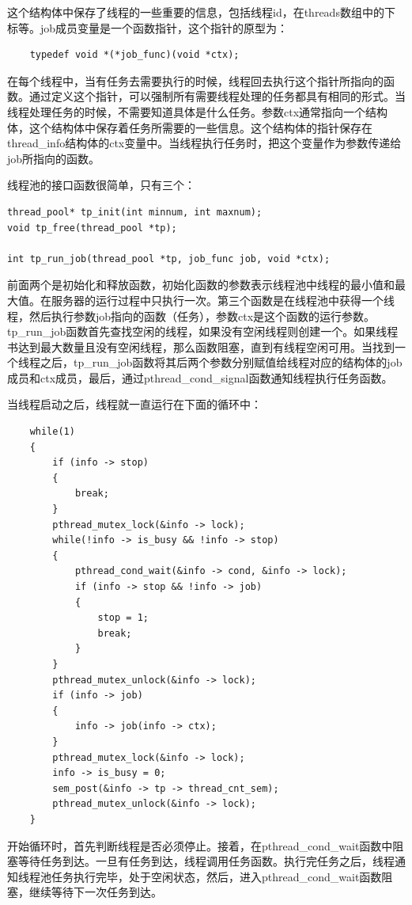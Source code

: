 \documentclass[12pt, twoside, a4paper, xetex]{report}
\begin{document}
	这个结构体中保存了线程的一些重要的信息，包括线程id，在threads数组中的下标等。job成员变量是一个函数指针，这个指针的原型为：
\begin{verbatim}
	typedef void *(*job_func)(void *ctx); 
\end{verbatim}

	在每个线程中，当有任务去需要执行的时候，线程回去执行这个指针所指向的函数。通过定义这个指针，可以强制所有需要线程处理的任务都具有相同的形式。当线程处理任务的时候，不需要知道具体是什么任务。参数ctx通常指向一个结构体，这个结构体中保存着任务所需要的一些信息。这个结构体的指针保存在thread\_info结构体的ctx变量中。当线程执行任务时，把这个变量作为参数传递给job所指向的函数。
	
	线程池的接口函数很简单，只有三个：
\begin{verbatim}
thread_pool* tp_init(int minnum, int maxnum);
void tp_free(thread_pool *tp);

int tp_run_job(thread_pool *tp, job_func job, void *ctx);
\end{verbatim}

	前面两个是初始化和释放函数，初始化函数的参数表示线程池中线程的最小值和最大值。在服务器的运行过程中只执行一次。第三个函数是在线程池中获得一个线程，然后执行参数job指向的函数（任务），参数ctx是这个函数的运行参数。tp\_run\_job函数首先查找空闲的线程，如果没有空闲线程则创建一个。如果线程书达到最大数量且没有空闲线程，那么函数阻塞，直到有线程空闲可用。当找到一个线程之后，tp\_run\_job函数将其后两个参数分别赋值给线程对应的结构体的job成员和ctx成员，最后，通过pthread\_cond\_signal函数通知线程执行任务函数。
	
	当线程启动之后，线程就一直运行在下面的循环中：

\begin{verbatim}
	while(1)
	{
		if (info -> stop)
		{
			break;
		}
		pthread_mutex_lock(&info -> lock);
		while(!info -> is_busy && !info -> stop)
		{
			pthread_cond_wait(&info -> cond, &info -> lock);
			if (info -> stop && !info -> job)
			{
				stop = 1;
				break;
			}
		}
		pthread_mutex_unlock(&info -> lock);
		if (info -> job)
		{
			info -> job(info -> ctx);
		}
		pthread_mutex_lock(&info -> lock);
		info -> is_busy = 0;
		sem_post(&info -> tp -> thread_cnt_sem);
		pthread_mutex_unlock(&info -> lock);
	}
\end{verbatim}

	开始循环时，首先判断线程是否必须停止。接着，在pthread\_cond\_wait函数中阻塞等待任务到达。一旦有任务到达，线程调用任务函数。执行完任务之后，线程通知线程池任务执行完毕，处于空闲状态，然后，进入pthread\_cond\_wait函数阻塞，继续等待下一次任务到达。
	
\end{document}
